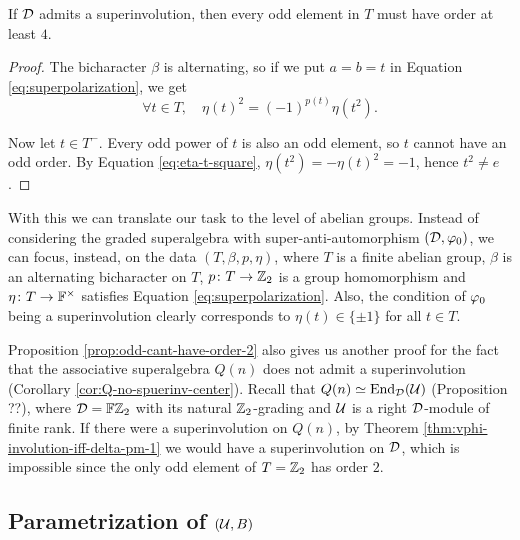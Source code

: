 \begin{cor}\label{cor:odd-cant-have-order-2}
    If $\mathcal{D}$ admits a superinvolution, %
    then every odd element in $T$ must have order at least $4$.
\end{cor}

\begin{proof}
    The bicharacter $\beta$ is alternating, so if we put $a = b = t$ in Equation \eqref{eq:superpolarization}, we get
    \begin{equation}\label{eq:eta-t-square}
        \forall t\in T, \quad \eta (t)^2 = (-1)^{p(t)} \eta(t^2).
    \end{equation}
    
    Now let $t\in T^-$. 
    Every odd power of $t$ is also an odd element, so $t$ cannot have an odd order. 
    By Equation \eqref{eq:eta-t-square}, $\eta (t^2) = - \eta(t)^2 = -1$, hence $t^2 \neq e$.
\end{proof}

With this we can translate our task to the level of abelian groups. 
Instead of considering the graded superalgebra with super-anti-automorphism $(\mathcal{D}, \varphi_0)$, we can focus, instead, on the data $(T, \beta, p, \eta)$, where $T$ is a finite abelian group, $\beta$ is an alternating bicharacter on $T$, $p\colon T \to \mathbb{Z}_2$ is a group homomorphism and $\eta\colon T \to \mathbb{F}^\times$ satisfies Equation \eqref{eq:superpolarization}. 
Also, the condition of $\varphi_0$ being a superinvolution clearly corresponds to $\eta(t) \in \{ \pm 1 \}$ for all $t\in T$.



\begin{remark}
    Proposition \ref{prop:odd-cant-have-order-2} also gives us another proof for the fact that the associative superalgebra $Q(n)$ does not admit a superinvolution (Corollary \ref{cor:Q-no-spuerinv-center}). 
    Recall that $Q(n) \simeq \operatorname{End}_{\mathcal{D}} (\mathcal U)$ (Proposition ??), where $\mathcal{D}= \mathbb{F}\mathbb{Z}_2$ with its natural $\mathbb{Z}_2$-grading and $\mathcal U$ is a right $\mathcal{D}$-module of finite rank. 
    If there were a superinvolution on $Q(n)$, by Theorem \ref{thm:vphi-involution-iff-delta-pm-1} we would have a superinvolution on $\mathcal{D}$, which is impossible since the only odd element of $T = \mathbb{Z}_2$ has order $2$. 
\end{remark}


\subsection{Parametrization of $(\mathcal U, B)$}

